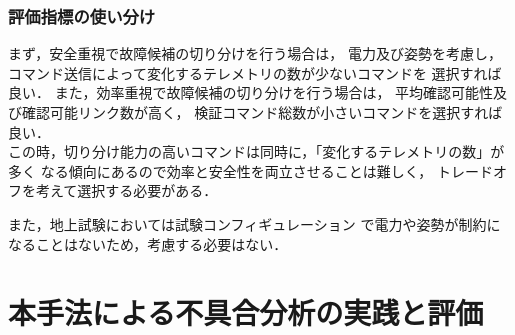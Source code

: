\documentclass[11pt]{jsarticle}%
\begin{document}
\begin{multicols}{2}
\subsubsection{評価指標の使い分け}
まず，安全重視で故障候補の切り分けを行う場合は，
電力及び姿勢を考慮し，コマンド送信によって変化するテレメトリの数が少ないコマンドを
選択すれば良い．
また，効率重視で故障候補の切り分けを行う場合は，
平均確認可能性及び確認可能リンク数が高く，
検証コマンド総数が小さいコマンドを選択すれば良い．\\
この時，切り分け能力の高いコマンドは同時に，「変化するテレメトリの数」が多く
なる傾向にあるので効率と安全性を両立させることは難しく，
トレードオフを考えて選択する必要がある．　%

また，地上試験においては試験コンフィギュレーション
で電力や姿勢が制約になることはないため，考慮する必要はない．

\section{本手法による不具合分析の実践と評価}
  \vspace{-1zh}

\end{multicols}
\end{document}
